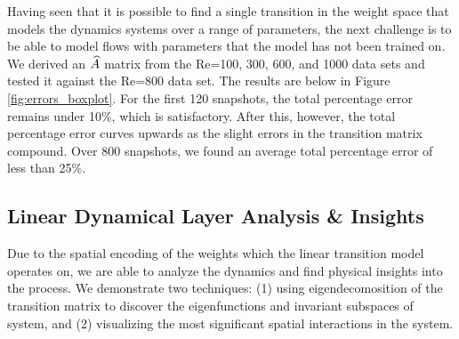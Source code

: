 Having seen that it is possible to find a single transition in the weight space that models the dynamics systems over a range of parameters, the next challenge is to be able to model flows with parameters that the model has not been trained on. We derived an $\widehat{A}$ matrix from the Re=100, 300, 600, and 1000 data sets and tested it against the Re=800 data set. The results are below in Figure \ref{fig:errors_boxplot}. For the first 120 snapshots, the total percentage error remains under 10\%, which is satisfactory. After this, however, the total percentage error curves upwards as the slight errors in the transition matrix compound. Over 800 snapshots, we found an average total percentage error of less than 25\%. %

\subsection{Linear Dynamical Layer Analysis \& Insights}\label{sec:analysis}
Due to the spatial encoding of the weights which the linear transition model operates on, we are able to analyze the dynamics and find physical insights into the process. We demonstrate two techniques: (1) using eigendecomosition of the transition matrix to discover the eigenfunctions and invariant subspaces of system, and (2) visualizing the most significant spatial interactions in the system.


